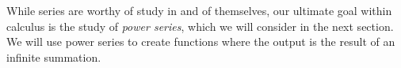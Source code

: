 \documentclass{ximera}
\begin{document}
While series are worthy of study in and of themselves, our ultimate
goal within calculus is the study of \textit{power series}, which we
will consider in the next section. We will use power series to create
functions where the output is the result of an infinite summation.

\end{document}
